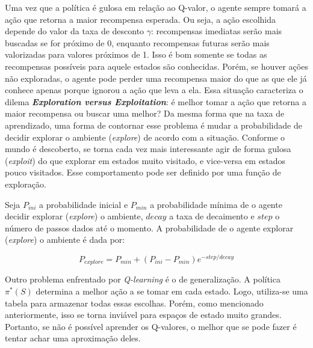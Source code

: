 Uma vez que a política é gulosa em relação ao Q-valor, o agente sempre tomará a ação que retorna a maior recompensa esperada.
Ou seja, a ação escolhida depende do valor da taxa de desconto $\gamma$: recompensas imediatas serão mais buscadas se for próximo de 0, enquanto recompensas futuras serão mais valorizadas para valores próximos de 1.
Isso é bom somente se todas as recompensas possíveis para aquele estados são conhecidas.
Porém, se houver ações não exploradas, o agente pode perder uma recompensa maior do que as que ele já conhece apenas porque ignorou a ação que leva a ela.
Essa situação caracteriza o dilema \textbf{\textit{Exploration versus Exploitation}}: é melhor tomar a ação que retorna a maior recompensa ou buscar uma melhor?
Da mesma forma que na taxa de aprendizado, uma forma de contornar esse problema é mudar a probabilidade de decidir explorar o ambiente (\textit{explore}) de acordo com a situação.
Conforme o mundo é descoberto, se torna cada vez mais interessante agir de forma gulosa (\textit{exploit}) do que explorar em estados muito visitado, e vice-versa em estados pouco visitados.
Esse comportamento pode ser definido por uma função de exploração.

Seja $P_{ini}$ a probabilidade inicial e $P_{min}$ a probabilidade mínima de o agente decidir explorar (\textit{explore}) o ambiente, $decay$ a taxa de decaimento e $step$ o número de passos dados até o momento.
A probabilidade de o agente explorar (\textit{explore}) o ambiente é dada por:

\begin{equation} \label{eq:exp_exp_prob}
P_{explore} = P_{min} + (P_{ini} - P_{min})e^{-step/decay}
\end{equation}

Outro problema enfrentado por \textit{Q-learning} é o de generalização.
A política $\pi^{*}(S)$ determina a melhor ação a se tomar em cada estado.
Logo, utiliza-se uma tabela para armazenar todas essas escolhas.
Porém, como mencionado anteriormente, isso se torna inviável para espaços de estado muito grandes.
Portanto, se não é possível aprender os Q-valores, o melhor que se pode fazer é tentar achar uma aproximação deles.

